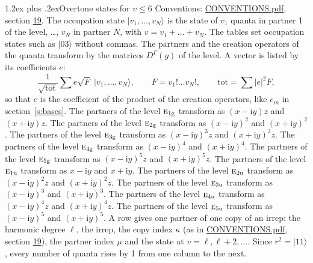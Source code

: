 \documentclass[10pt,a4paper]{article}
\makeatletter
\renewcommand\section{\@startsection{section}{1}{\z@}{-3ex plus -1ex minus -.2ex}%
  {1.2ex plus .2ex}{\normalfont\large\sffamily\bfseries\color{parttitle}}}
\numberwithin{equation}{section}
\newcommand{\irr}[1]{\text{\normalfont\scshape #1}}
\newcommand{\ptag}[1]{\mathrm{#1}}
\newcommand{\iunit}{\mathrm{i}}
\newcommand{\repD}[1]{D^{#1}}
\newcommand{\mult}{\kappa}
\newcommand{\intx}{\mu}
\newcommand{\occ}[1]{\lvert #1\rangle}
\makeatother
\begin{document}
\section{Overtone states for \texorpdfstring{$v \le 6$}{v \textleq\ 6}}\label{s:overtone_states}
Conventions: \href{../../CONVENTIONS.pdf}{CONVENTIONS.pdf}, section \href{../../CONVENTIONS.pdf\#conv.19}{19}.
\leavevmode\label{n:vector.occupation}\label{n:local.quanta.partner}\label{n:local.weight.occupation}The occupation state $\occ{v_1, \dots, v_N}$ is the state of $v_1$ quanta in partner 1 of the level, \dots, $v_N$ in partner $N$, with $v = v_1 + \dots + v_N$. The tables set occupation states such as $\occ{03}$ without commas. The partners and the creation operators of the quanta transform by the matrices $\repD{\Gamma}(g)$ of the level. A vector is listed by its coefficients $e$:
\begin{equation}\label{e:occupation}\frac{1}{\sqrt{\mathrm{tot}}}\sum e\sqrt{F}\;\occ{v_1, \dots, v_N},\qquad F = v_1!\dots v_N!,\qquad \mathrm{tot} = \sum |e|^2F,\end{equation}
so that $e$ is the coefficient of the product of the creation operators, like $e_m$ in section~\ref{s:bases}. The partners of the level $\irr{e}_{1\ptag{g}}$ transform as $(x - \iunit y) z$ and $(x + \iunit y) z$. The partners of the level $\irr{e}_{2\ptag{g}}$ transform as $(x - \iunit y)^{2}$ and $(x + \iunit y)^{2}$. The partners of the level $\irr{e}_{3\ptag{g}}$ transform as $(x - \iunit y)^{3} z$ and $(x + \iunit y)^{3} z$. The partners of the level $\irr{e}_{4\ptag{g}}$ transform as $(x - \iunit y)^{4}$ and $(x + \iunit y)^{4}$. The partners of the level $\irr{e}_{5\ptag{g}}$ transform as $(x - \iunit y)^{5} z$ and $(x + \iunit y)^{5} z$. The partners of the level $\irr{e}_{1\ptag{u}}$ transform as $x - \iunit y$ and $x + \iunit y$. The partners of the level $\irr{e}_{2\ptag{u}}$ transform as $(x - \iunit y)^{2} z$ and $(x + \iunit y)^{2} z$. The partners of the level $\irr{e}_{3\ptag{u}}$ transform as $(x - \iunit y)^{3}$ and $(x + \iunit y)^{3}$. The partners of the level $\irr{e}_{4\ptag{u}}$ transform as $(x - \iunit y)^{4} z$ and $(x + \iunit y)^{4} z$. The partners of the level $\irr{e}_{5\ptag{u}}$ transform as $(x - \iunit y)^{5}$ and $(x + \iunit y)^{5}$. A row gives one partner of one copy of an irrep: the harmonic degree $\ell$, the irrep, the copy index $\mult$ (as in \href{../../CONVENTIONS.pdf}{CONVENTIONS.pdf}, section \href{../../CONVENTIONS.pdf\#conv.19}{19}), the partner index $\intx$ and the state at $v = \ell, \ell + 2, \dots$. Since $r^2 = \occ{11}$, every number of quanta rises by 1 from one column to the next.
\end{document}
